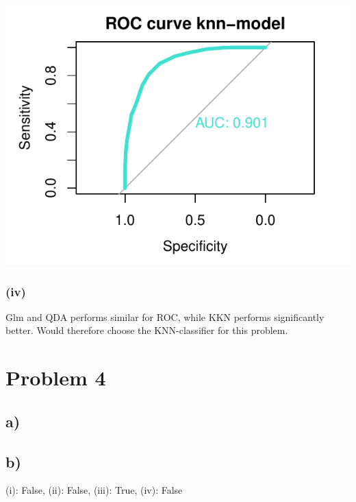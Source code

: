 \documentclass[
]{article}
\newenvironment{Shaded}{\begin{snugshade}}{\end{snugshade}}
\newcommand{\AttributeTok}[1]{\textcolor[rgb]{0.77,0.63,0.00}{#1}}
\newcommand{\ConstantTok}[1]{\textcolor[rgb]{0.00,0.00,0.00}{#1}}
\newcommand{\DecValTok}[1]{\textcolor[rgb]{0.00,0.00,0.81}{#1}}
\newcommand{\FunctionTok}[1]{\textcolor[rgb]{0.00,0.00,0.00}{#1}}
\newcommand{\NormalTok}[1]{#1}
\newcommand{\OtherTok}[1]{\textcolor[rgb]{0.56,0.35,0.01}{#1}}
\newcommand{\SpecialCharTok}[1]{\textcolor[rgb]{0.00,0.00,0.00}{#1}}
\newcommand{\StringTok}[1]{\textcolor[rgb]{0.31,0.60,0.02}{#1}}
\begin{document}
\begin{Shaded}
\end{Shaded}

\begin{center}\includegraphics{Exercise1_files/figure-latex/unnamed-chunk-19-3} \end{center}

\hypertarget{iv}{%
\subsubsection{(iv)}\label{iv}}

Glm and QDA performs similar for ROC, while KKN performs significantly
better. Would therefore choose the KNN-classifier for this problem.

\hypertarget{problem-4}{%
\section{Problem 4}\label{problem-4}}

\hypertarget{a-2}{%
\subsection{a)}\label{a-2}}

\hypertarget{b-2}{%
\subsection{b)}\label{b-2}}

(i): False, (ii): False, (iii): True, (iv): False
\end{document}
